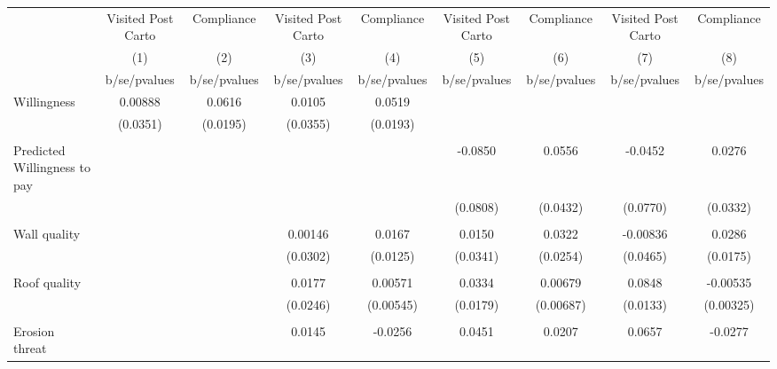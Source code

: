 {
\def\sym#1{\ifmmode^{#1}\else\(^{#1}\)\fi}
\begin{tabular}{l*{8}{c}}
\toprule
                &\multicolumn{1}{c}{Visited Post Carto}&\multicolumn{1}{c}{Compliance}&\multicolumn{1}{c}{Visited Post Carto}&\multicolumn{1}{c}{Compliance}&\multicolumn{1}{c}{Visited Post Carto}&\multicolumn{1}{c}{Compliance}&\multicolumn{1}{c}{Visited Post Carto}&\multicolumn{1}{c}{Compliance}\\
                &\multicolumn{1}{c}{(1)}&\multicolumn{1}{c}{(2)}&\multicolumn{1}{c}{(3)}&\multicolumn{1}{c}{(4)}&\multicolumn{1}{c}{(5)}&\multicolumn{1}{c}{(6)}&\multicolumn{1}{c}{(7)}&\multicolumn{1}{c}{(8)}\\
                &b/se/pvalues&b/se/pvalues&b/se/pvalues&b/se/pvalues&b/se/pvalues&b/se/pvalues&b/se/pvalues&b/se/pvalues\\
\midrule
Willingness     &  0.00888&   0.0616&   0.0105&   0.0519&         &         &         &         \\
                & (0.0351)& (0.0195)& (0.0355)& (0.0193)&         &         &         &         \\
                &         &         &         &         &         &         &         &         \\
Predicted Willingness to pay&         &         &         &         &  -0.0850&   0.0556&  -0.0452&   0.0276\\
                &         &         &         &         & (0.0808)& (0.0432)& (0.0770)& (0.0332)\\
                &         &         &         &         &         &         &         &         \\
Wall quality    &         &         &  0.00146&   0.0167&   0.0150&   0.0322& -0.00836&   0.0286\\
                &         &         & (0.0302)& (0.0125)& (0.0341)& (0.0254)& (0.0465)& (0.0175)\\
                &         &         &         &         &         &         &         &         \\
Roof quality    &         &         &   0.0177&  0.00571&   0.0334&  0.00679&   0.0848& -0.00535\\
                &         &         & (0.0246)&(0.00545)& (0.0179)&(0.00687)& (0.0133)&(0.00325)\\
                &         &         &         &         &         &         &         &         \\
Erosion threat  &         &         &   0.0145&  -0.0256&   0.0451&   0.0207&   0.0657&  -0.0277\\

\end{tabular}}
